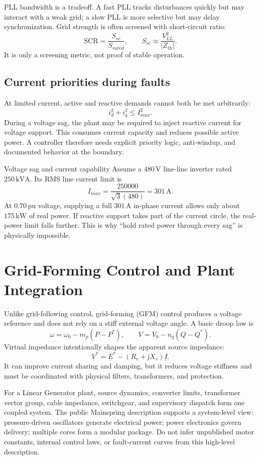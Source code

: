 \documentclass[11pt]{article}
\newcommand{\jop}{\mathrm{j}}
\newcommand{\V}{\mathrm{V}}
\newcommand{\A}{\mathrm{A}}
\newcommand{\kW}{\mathrm{kW}}
\newcommand{\kVA}{\mathrm{kVA}}
\begin{document}
PLL bandwidth is a tradeoff. A fast PLL tracks disturbances quickly but may interact with a weak grid; a slow PLL is more selective but may delay synchronization. Grid strength is often screened with short-circuit ratio:
\[
\mathrm{SCR}=\frac{S_{sc}}{S_{rated}},\qquad S_{sc}\approx\frac{V_{LL}^2}{|Z_{th}|}.
\]
It is only a screening metric, not proof of stable operation.

\subsection{Current priorities during faults}
At limited current, active and reactive demands cannot both be met arbitrarily:
\[
i_d^2+i_q^2\leq I_{max}^2.
\]
During a voltage sag, the plant may be required to inject reactive current for voltage support. This consumes current capacity and reduces possible active power. A controller therefore needs explicit priority logic, anti-windup, and documented behavior at the boundary.

\begin{examplebox}{Voltage sag and current capability}
Assume a $480\,\V$ line-line inverter rated $250\,\kVA$. Its RMS line current limit is
\[
I_{max}=\frac{250000}{\sqrt3(480)}=301\,\A.
\]
At $0.70\,\mathrm{pu}$ voltage, supplying a full $301\,\A$ in-phase current allows only about $175\,\kW$ of real power. If reactive support takes part of the current circle, the real-power limit falls further. This is why ``hold rated power through every sag'' is physically impossible.
\end{examplebox}

\section{Grid-Forming Control and Plant Integration}
Unlike grid-following control, grid-forming (GFM) control produces a voltage reference and does not rely on a stiff external voltage angle. A basic droop law is
\[
\omega=\omega_0-m_p(P-P^*),\qquad V=V_0-n_q(Q-Q^*).
\]
Virtual impedance intentionally shapes the apparent source impedance:
\[
\underline V^*=\underline E^*-(R_v+\jop X_v)\underline I.
\]
It can improve current sharing and damping, but it reduces voltage stiffness and must be coordinated with physical filters, transformers, and protection.

For a Linear Generator plant, source dynamics, converter limits, transformer vector group, cable impedance, switchgear, and supervisory dispatch form one coupled system. The public Mainspring description supports a system-level view: pressure-driven oscillators generate electrical power; power electronics govern delivery; multiple cores form a modular package. Do not infer unpublished motor constants, internal control laws, or fault-current curves from this high-level description.
\end{document}
